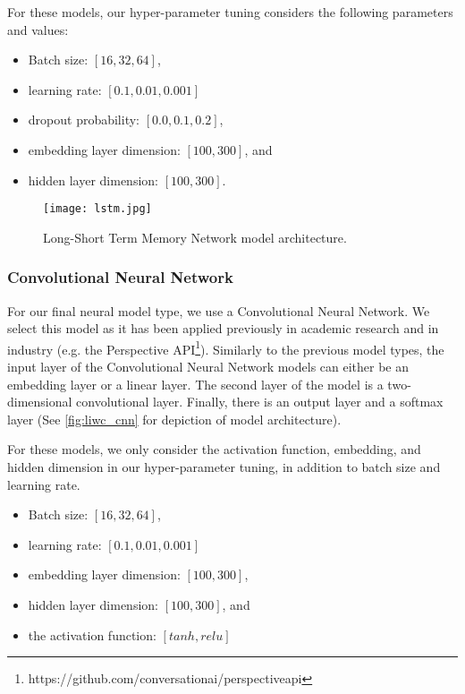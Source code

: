 For these models, our hyper-parameter tuning considers the following parameters and values:

\begin{itemize}
  \item Batch size: $[16, 32, 64]$,
  \item learning rate: $[0.1, 0.01, 0.001]$
  \item dropout probability: $[0.0, 0.1, 0.2]$,
  \item embedding layer dimension: $[100, 300]$, and
  \item hidden layer dimension: $[100, 300]$.
\end{itemize}

\begin{figure}
  \centering
  \texttt{[image: lstm.jpg]}
  \caption{Long-Short Term Memory Network model architecture.}
  \label{fig:liwc_lstm}
\end{figure}

\subsubsection{Convolutional Neural Network}

For our final neural model type, we use a Convolutional Neural Network. We select this model as it has been applied previously in academic research \cite{CITE: CNN papers} and in industry (e.g. the Perspective API\footnote{https://github.com/conversationai/perspectiveapi}). Similarly to the previous model types, the input layer of the Convolutional Neural Network models can either be an embedding layer or a linear layer. The second layer of the model is a two-dimensional convolutional layer. Finally, there is an output layer and a softmax layer (See \autoref{fig:liwc_cnn} for depiction of model architecture).

For these models, we only consider the activation function, embedding, and hidden dimension in our hyper-parameter tuning, in addition to batch size and learning rate.

\begin{itemize}
  \item Batch size: $[16, 32, 64]$,
  \item learning rate: $[0.1, 0.01, 0.001]$
  \item embedding layer dimension: $[100, 300]$,
  \item hidden layer dimension: $[100, 300]$, and
  \item the activation function: $[tanh, relu]$
\end{itemize}

